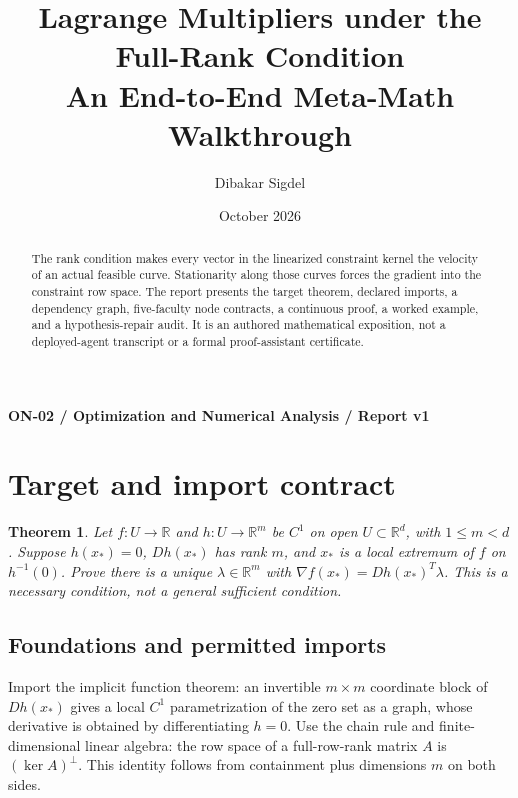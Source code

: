 \documentclass[preprint,12pt,aps,pra,showkeys,amsmath,amssymb,superscriptaddress,floatfix]{revtex4-2}
\newtheorem{theorem}{Theorem}[section]
\theoremstyle{definition}
\theoremstyle{remark}
\begin{document}
\title{Lagrange Multipliers under the Full-Rank Condition\\[4pt]\large An End-to-End Meta-Math Walkthrough}

\author{Dibakar Sigdel}


\date{October 2026}

\begin{abstract}

The rank condition makes every vector in the linearized constraint
kernel the velocity of an actual feasible curve. Stationarity along
those curves forces the gradient into the constraint row space. The
report presents the target theorem, declared imports, a dependency
graph, five-faculty node contracts, a continuous proof, a worked
example, and a hypothesis-repair audit. It is an authored mathematical
exposition, not a deployed-agent transcript or a formal proof-assistant
certificate.

\end{abstract}\maketitle\linespread{1.12}\selectfont

\noindent\textbf{ON-02 / Optimization and Numerical Analysis / Report v1}

\section{Target and import contract}

\begin{theorem}

Let \(f:U\to\mathbb R\) and \(h:U\to\mathbb R^m\) be \(C^1\) on open
\(U\subset\mathbb R^d\), with \(1\le m<d\). Suppose \(h(x_*)=0\),
\(Dh(x_*)\) has rank \(m\), and \(x_*\) is a local extremum of \(f\) on
\(h^{-1}(0)\). Prove there is a unique \(\lambda\in\mathbb R^m\) with
\(\nabla f(x_*)=Dh(x_*)^T\lambda\). This is a necessary condition, not a
general sufficient condition.

\end{theorem}

\subsection{Foundations and permitted imports}

Import the implicit function theorem: an invertible \(m\times m\)
coordinate block of \(Dh(x_*)\) gives a local \(C^1\) parametrization of
the zero set as a graph, whose derivative is obtained by differentiating
\(h=0\). Use the chain rule and finite-dimensional linear algebra: the
row space of a full-row-rank matrix \(A\) is \((\ker A)^\perp\). This
identity follows from containment plus dimensions \(m\) on both sides.
\end{document}
